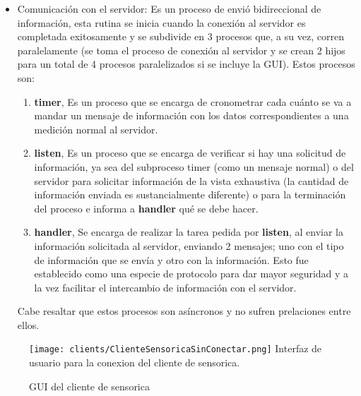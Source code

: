 \begin{itemize}
    \item Comunicación con el servidor: Es un proceso de envió bidireccional
        de información, esta rutina se inicia cuando la conexión al servidor
        es completada exitosamente y se subdivide en 3 procesos que, a su
        vez, corren paralelamente (se toma el proceso de conexión al servidor
        y se crean 2 hijos para un total de 4 procesos paralelizados si se
        incluye la GUI). Estos procesos son:

        \begin{enumerate}
            \item \textbf{timer}, Es un proceso que se encarga de cronometrar
                cada cuánto
                se va a mandar un mensaje de información con los datos
                correspondientes a una medición normal al servidor.

            \item \textbf{listen}, Es un proceso que se encarga de verificar si
                hay una
                solicitud de información, ya sea del subproceso timer (como un
                mensaje normal) o del servidor para solicitar información de la
                vista exhaustiva (la cantidad de información enviada es sustancialmente
                diferente) o para la terminación del proceso e informa a \textbf{handler}
                qué se debe hacer.

            \item \textbf{handler}, Se encarga de realizar la tarea pedida por \textbf{listen},
                al enviar la información solicitada al servidor, enviando 2 mensajes;
                uno con el tipo de información que se envía y otro con la información.
                Esto fue establecido como una especie de protocolo para dar mayor
                seguridad y a la vez facilitar el intercambio de información con
                el servidor.
        \end{enumerate}

        Cabe resaltar que estos procesos son asíncronos y no sufren prelaciones
        entre ellos.
\end{itemize}

    \begin{figure}[htb]
		\centering
        \caption{GUI del cliente de sensorica}
        \texttt{[image: clients/ClienteSensoricaSinConectar.png]}
        Interfaz de usuario para la conexion del cliente de sensorica. \label{img:fyne}
	\end{figure}

